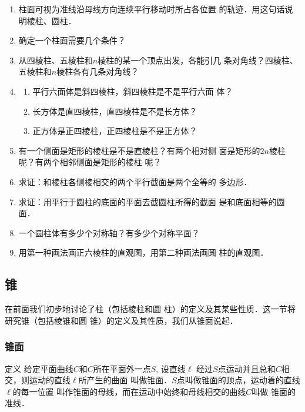 \begin{ex}
\begin{enumerate}
    \item 柱面可视为准线沿母线方向连续平行移动时所占各位置
    的轨迹．用这句话说明棱柱、圆柱．
    \item 确定一个柱面需要几个条件？
    \item 从四棱柱、五棱柱和$n$棱柱的某一个顶点出发，各能引几
    条对角线？四棱柱、五棱柱和$n$棱柱各有几条对角线？
    \item \begin{enumerate}
    \item 平行六面体是斜四棱柱，斜四棱柱是不是平行六面
体？
\item 长方体是直四棱柱，直四棱柱是不是长方体？
\item 正方体是正四棱柱，正四棱柱是不是正方体？
    \end{enumerate} 

\item 有一个侧面是矩形的棱柱是不是直棱柱？有两个相对侧
面是矩形的$2n$棱柱呢？有两个相邻侧面是矩形的棱柱
呢？
\item 求证：和棱柱各侧棱相交的两个平行截面是两个全等的
多边形．
\item 求证：用平行于圆柱的底面的平面去截圆柱所得的截面
是和底面相等的圆面．
\item 一个圆柱体有多少个对称轴？有多少个对称平面？
\item 用第一种画法画正六棱柱的直观图，用第二种画法画圆
柱的直观图．
\end{enumerate}  
\end{ex}

\subsection{锥}

在前面我们初步地讨论了柱（包括棱柱和圆
柱）的定义及其某些性质．这一节将研究锥（包括棱锥和圆
锥）的定义及其性质，我们从锥面说起．

\subsubsection{锥面}

\begin{blk}
    {定义} 给定平面曲线$C$和$C$所在平面外一点$S$, 设直线$\ell$
经过$S$点运动并且总和$C$相交，则运动的直线$\ell$所产生的曲面
叫做锥面．$S$点叫做锥面的顶点，运动着的直线$\ell$的每一位置
叫作锥面的母线，而在运动中始终和母线相交的曲线$C$叫做
锥面的准线．
\end{blk}

